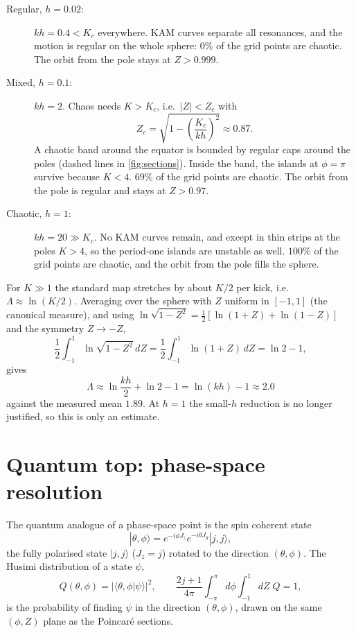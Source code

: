 \documentclass[11pt,a4paper]{article}
\begin{document}
\begin{description}
\item[Regular, $h=0.02$:] $kh=0.4<K_c$ everywhere. KAM curves separate all resonances, and the motion is regular on the
  whole sphere: $0\%$ of the grid points are chaotic. The orbit from the pole stays at $Z>0.999$.
\item[Mixed, $h=0.1$:] $kh=2$. Chaos needs $K>K_c$, i.e.\ $|Z|<Z_c$ with
  \begin{equation}\label{eq:Zc}
    Z_c = \sqrt{1-\left(\frac{K_c}{kh}\right)^2} \approx 0.87 .
  \end{equation}
  A chaotic band around the equator is bounded by regular caps around the poles (dashed lines in
  \cref{fig:sections}). Inside the band, the islands at $\phi=\pi$ survive because $K<4$. $69\%$ of the grid
  points are chaotic. The orbit from the pole is regular and stays at $Z>0.97$.
\item[Chaotic, $h=1$:] $kh=20\gg K_c$. No KAM curves remain, and except in thin strips at the poles $K>4$, so the
  period-one islands are unstable as well. $100\%$ of the grid points are chaotic, and the orbit from the pole fills the
  sphere.
\end{description}
For $K\gg1$ the standard map stretches by about $K/2$ per kick, i.e.\ $\Lambda\approx\ln(K/2)$. Averaging over the
sphere with $Z$ uniform in $[-1,1]$ (the canonical measure), and using
$\ln\sqrt{1-Z^2}=\tfrac12[\ln(1+Z)+\ln(1-Z)]$ and the symmetry $Z\to-Z$,
\begin{equation}
  \frac12\int_{-1}^{1}\ln\sqrt{1-Z^2}\,dZ = \frac12\int_{-1}^{1}\ln(1+Z)\,dZ = \ln2-1,
\end{equation}
gives
\begin{equation}
  \Lambda \approx \ln\frac{kh}{2} + \ln2 - 1 = \ln(kh) - 1 \approx 2.0
\end{equation}
against the measured mean $1.89$. At $h=1$ the small-$h$ reduction is no longer justified, so this is only an
estimate.

\section{Quantum top: phase-space resolution}\label{sec:quantum}

The quantum analogue of a phase-space point is the spin coherent state
\begin{equation}
  |\theta,\phi\rangle = e^{-i\phi J_z}e^{-i\theta J_y}|j,j\rangle ,
\end{equation}
the fully polarised state $|j,j\rangle$ ($J_z=j$) rotated to the direction $(\theta,\phi)$. The Husimi distribution of
a state $\psi$,
\begin{equation}\label{eq:Q}
  Q(\theta,\phi) = |\langle\theta,\phi|\psi\rangle|^2 ,\qquad
  \frac{2j+1}{4\pi}\int_{-\pi}^{\pi}\!d\phi\int_{-1}^{1}\!dZ\;Q = 1,
\end{equation}
is the probability of finding $\psi$ in the direction $(\theta,\phi)$, drawn on the same $(\phi,Z)$ plane as the
Poincar\'e sections.
\end{document}
